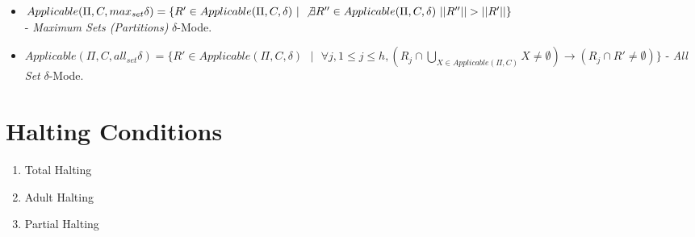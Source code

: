 \documentclass[a4paper]{article}
\theoremstyle{definition}
\newcommand{\ts}{\text{ }}
\begin{document}
\begin{itemize}
   \item $Applicable(\Pi, C, max_{set}\delta) = \{R' \in Applicable(\Pi, C, \delta) \ts | \ts \not\exists R'' \in  
         Applicable(\Pi,C, \delta) \ts ||R''|| > ||R'||\}$\\ - \textit{Maximum Sets (Partitions)} $            
         \delta$-Mode.                                                                                  
   \item $Applicable(\Pi, C, all_{set}\delta) = \{R' \in Applicable(\Pi, C, \delta) \ts | \ts \forall j, 1 \leq j  
         \leq h, (R_j \cap \bigcup_{X \in Applicable(\Pi,C)} X \neq \emptyset) \rightarrow (R_j \cap R'    
         \neq \emptyset)\}$ - \textit{All Set} $\delta$-Mode.                                           
\end{itemize}


\section{Halting Conditions}\label{app-halt}

\begin{enumerate}
\item Total Halting
\item Adult Halting
\item Partial Halting 
\end{enumerate}



\end{document}
